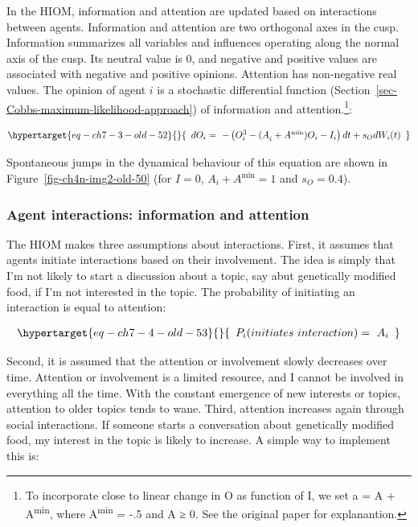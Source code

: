 \documentclass[
  a4paper,
  DIV=11,
  numbers=noendperiod]{scrreprt}
\begin{document}
In the HIOM, information and attention are updated based on interactions
between agents. Information and attention are two orthogonal axes in the
cusp. Information summarizes all variables and influences operating
along the normal axis of the cusp. Its neutral value is 0, and negative
and positive values are associated with negative and positive opinions.
Attention has non-negative real values. The opinion of agent \(i\) is a
stochastic differential function
(Section~\ref{sec-Cobbs-maximum-likelihood-approach}) of information and
attention.\footnote{To incorporate close to linear change in O as
  function of I, we set a = A + A\textsuperscript{min}, where
  A\textsuperscript{min} = -.5 and A ≥ 0. See the original paper for
  explanantion.}:

\begin{equation}\protect\hypertarget{eq-ch7-3-old-52}{}{\begin{array}{r}
dO_{i} = \  - \left( O_{i}^{3} - {(A}_{i} + A^{\min})O_{i} - I_{i} \right)dt + s_{O}dW_{i}(t)
\end{array}}\label{eq-ch7-3-old-52}\end{equation}

Spontaneous jumps in the dynamical behaviour of this equation are shown
in Figure~\ref{fig-ch4n-img2-old-50} (for \(I = 0\),
\(A_{i} + A^{\min} = 1\) and \(s_{O} = 0.4\)).

\hypertarget{sec-Agent-interactions-information-and-attention}{%
\subsubsection{Agent interactions: information and
attention}\label{sec-Agent-interactions-information-and-attention}}

The HIOM makes three assumptions about interactions. First, it assumes
that agents initiate interactions based on their involvement. The idea
is simply that I'm not likely to start a discussion about a topic, say
abut genetically modified food, if I'm not interested in the topic. The
probability of initiating an interaction is equal to attention:

\begin{equation}\protect\hypertarget{eq-ch7-4-old-53}{}{\begin{array}{r}
P_{i}(initiates\ interaction) = \ A_{i}
\end{array}}\label{eq-ch7-4-old-53}\end{equation}

Second, it is assumed that the attention or involvement slowly decreases
over time. Attention or involvement is a limited resource, and I cannot
be involved in everything all the time. With the constant emergence of
new interests or topics, attention to older topics tends to wane. Third,
attention increases again through social interactions. If someone starts
a conversation about genetically modified food, my interest in the topic
is likely to increase. A simple way to implement this is:
\end{document}
